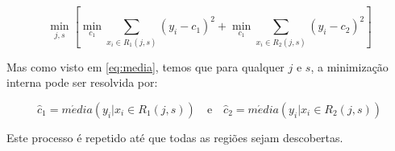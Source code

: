 \begin{equation}
\min_{j,s} \left [ \min_{c_{1}} \sum_{x_{i} \in R_{1} (j,s)} (y_{i} - c_{1})^{2} + \min_{c_{1}} \sum_{x_{i} \in R_{2} (j,s)}(y_{i} - c_{2})^{2} \right ]
\end{equation} 


Mas como visto em \ref{eq:media}, temos que para qualquer $j$ e $s$, a minimização interna pode ser resolvida por:

\begin{equation}
\hat c_{1} = m\acute edia(y_{i} | x_{i} \in R_{1}(j,s)) \quad \textrm{e} \quad \hat c_{2} = m\acute edia(y_{i} | x_{i} \in R_{2}(j,s))
\end{equation} 

Este processo é repetido até que todas as regiões sejam descobertas.
